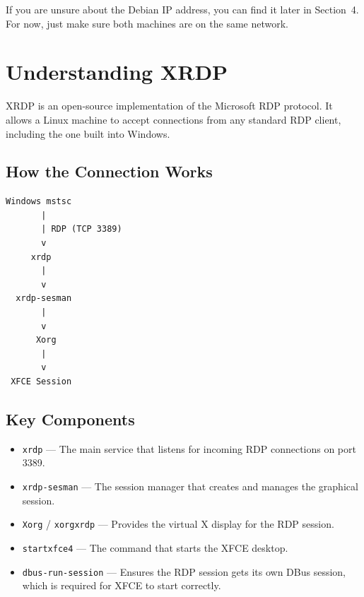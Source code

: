 \documentclass[a4paper,12pt]{article}
\newcommand{\code}[1]{\texttt{\small #1}}
\begin{document}
\begin{tipbox}
If you are unsure about the Debian IP address, you can find it later in Section~4. For now, just make sure both machines are on the same network.
\end{tipbox}

\section{Understanding XRDP}

XRDP is an open-source implementation of the Microsoft RDP protocol. It allows a Linux machine to accept connections from any standard RDP client, including the one built into Windows.

\subsection{How the Connection Works}

\begin{lstlisting}[style=textstyle]
Windows mstsc
       |
       | RDP (TCP 3389)
       v
     xrdp
       |
       v
  xrdp-sesman
       |
       v
      Xorg
       |
       v
 XFCE Session
\end{lstlisting}

\subsection{Key Components}

\begin{itemize}[leftmargin=2em]
    \item \code{xrdp} --- The main service that listens for incoming RDP connections on port 3389.
    \item \code{xrdp-sesman} --- The session manager that creates and manages the graphical session.
    \item \code{Xorg} / \code{xorgxrdp} --- Provides the virtual X display for the RDP session.
    \item \code{startxfce4} --- The command that starts the XFCE desktop.
    \item \code{dbus-run-session} --- Ensures the RDP session gets its own DBus session, which is required for XFCE to start correctly.
\end{itemize}

\end{document}
